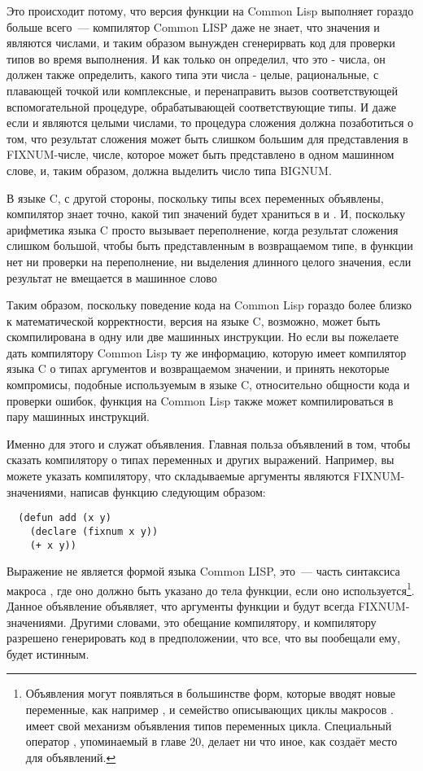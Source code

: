 Это происходит потому, что версия функции на Common Lisp выполняет гораздо больше
всего~--- компилятор Common LISP даже не знает, что значения  и  являются
числами, и таким образом вынужден сгенерирвать код для проверки типов во время выполнения.
И как только он определил, что это - числа, он должен также определить, какого типа эти
числа - целые, рациональные, с плавающей точкой или комплексные, и перенаправить вызов
соответствующей вспомогательной процедуре, обрабатывающей соответствующие типы. И даже
если  и  являются целыми числами, то процедура сложения должна
позаботиться о том, что результат сложения может быть слишком большим для представления в
FIXNUM-числе, числе, которое может быть представлено в одном машинном слове, и, таким
образом, должна выделить число типа BIGNUM.

В языке C, с другой стороны, поскольку типы всех переменных объявлены, компилятор знает
точно, какой тип значений будет храниться в  и . И, поскольку арифметика
языка C просто вызывает переполнение, когда результат сложения слишком большой, чтобы быть
представленным в возвращаемом типе, в функции нет ни проверки на переполнение, ни
выделения длинного целого значения, если результат не вмещается в машинное слово

Таким образом, поскольку поведение кода на Common Lisp гораздо более близко к
математической корректности, версия на языке C, возможно, может быть скомпилирована в одну
или две машинных инструкции. Но если вы пожелаете дать компилятору Common Lisp ту же
информацию, которую имеет компилятор языка C о типах аргументов и возвращаемом значении, и
принять некоторые компромисы, подобные используемым в языке C, относительно общности кода
и проверки ошибок, функция на Common Lisp также может компилироваться в пару машинных
инструкций.

Именно для этого и служат объявления. Главная польза объявлений в том, чтобы сказать компилятору о типах переменных и других выражений. Например, вы можете указать компилятору, что складываемые аргументы являются FIXNUM-значениями, написав функцию следующим образом:

\begin{lstlisting}
  (defun add (x y)
    (declare (fixnum x y))
    (+ x y))
\end{lstlisting}

Выражение  не является формой языка Common LISP, это~--- часть синтаксиса
макроса , где оно должно быть указано до тела функции, если оно
используется\footnote{Объявления могут появляться в большинстве форм, которые вводят новые
  переменные, как например ,  и семейство описывающих циклы макросов
  .  имеет свой механизм объявления типов переменных
  цикла. Специальный оператор , упоминаемый в главе 20, делает ни что иное,
  как создаёт место для объявлений.}. Данное объявление объявляет, что аргументы функции
 и  будут всегда FIXNUM-значениями. Другими словами, это обещание
компилятору, и компилятору разрешено генерировать код в предположении, что все, что вы
пообещали ему, будет истинным.

